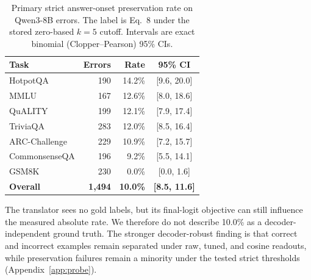 \documentclass{article} %
\begin{document}
\begin{table}[t]
\centering
\caption{Primary strict answer-onset preservation rate on Qwen3-8B errors. The label is Eq.~8 under the stored zero-based $k=5$ cutoff. Intervals are exact binomial (Clopper--Pearson) 95\% CIs.}
\label{tab:strict_rates}
\begin{tabular}{lrrc}
\toprule
\textbf{Task} & \textbf{Errors} & \textbf{Rate} & \textbf{95\% CI} \\
\midrule
HotpotQA & 190 & 14.2\% & [9.6, 20.0] \\
MMLU & 167 & 12.6\% & [8.0, 18.6] \\
QuALITY & 199 & 12.1\% & [7.9, 17.4] \\
TriviaQA & 283 & 12.0\% & [8.5, 16.4] \\
ARC-Challenge & 229 & 10.9\% & [7.2, 15.7] \\
CommonsenseQA & 196 & 9.2\% & [5.5, 14.1] \\
GSM8K & 230 & 0.0\% & [0.0, 1.6] \\
\midrule
\textbf{Overall} & \textbf{1{,}494} & \textbf{10.0\%} & \textbf{[8.5, 11.6]} \\
\bottomrule
\end{tabular}
\end{table}

The translator sees no gold labels, but its final-logit objective can still influence the measured absolute rate. We therefore do not describe 10.0\% as a decoder-independent ground truth. The stronger decoder-robust finding is that correct and incorrect examples remain separated under raw, tuned, and cosine readouts, while preservation failures remain a minority under the tested strict thresholds (Appendix~\ref{app:probe}).
\end{document}
